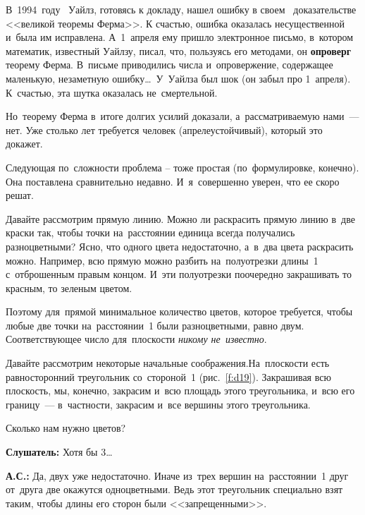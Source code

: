 В~1994~году ~Уайлз, готовясь к докладу, нашел ошибку в своем ~доказательстве <<великой теоремы Ферма>>. К счастью, ошибка оказалась
несущественной и~была им исправлена. А~1~апреля ему пришло электронное письмо, в~котором
математик, известный Уайлзу, писал, что, пользуясь его методами, он \textbf{опроверг} теорему Ферма.
В~письме приводились числа и~опровержение, содержащее маленькую, незаметную ошибку\ldots\ У~Уайлза был
шок (он забыл про 1~апреля). К~счастью, эта шутка оказалась не~смертельной.

Но~теорему Ферма в~итоге долгих усилий доказали, а~рассматриваемую нами~--- нет. Уже столько лет
требуется человек (апрелеустойчивый), который это докажет.


Следующая по~сложности проблема -- тоже простая (по~формулировке, конечно). Она поставлена
сравнительно недавно. И~я~совершенно уверен, что ее скоро решат.


Давайте рассмотрим прямую линию. Можно ли раскрасить прямую линию в~две краски так, чтобы точки
на~расстоянии единица всегда получались разноцветными? Ясно, что одного цвета недостаточно, а~в~два цвета раскрасить можно. Например, всю прямую можно
разбить на~полуотрезки длины~1 с~отброшенным правым концом. И~эти полуотрезки поочередно
закрашивать то красным, то зеленым цветом.


Поэтому для~прямой минимальное количество цветов, которое требуется, чтобы любые две точки
на~расстоянии~1 были разноцветными, равно двум. Соответствующее число для~плоскости \textit{никому
не~известно}.

\pagebreak

Давайте рассмотрим некоторые начальные соображения.\linebreak На~плоскости есть равносторонний треугольник
со~стороной~1 (рис.~\ref{f:d19}). Закрашивая всю плоскость, мы, конечно, закрасим и~всю площадь этого
треугольника, и~всю его границу~--- в~частности, закрасим и~все вершины этого треугольника.


Сколько нам нужно цветов?

\textbf{Слушатель:} Хотя бы 3\ldots

\textbf{А.С.:} Да, двух уже недостаточно. Иначе из~трех вершин на~расстоянии~1 друг от~друга две
окажутся одноцветными. Ведь этот треугольник специально взят таким, чтобы длины его сторон были
<<запрещенными>>.

